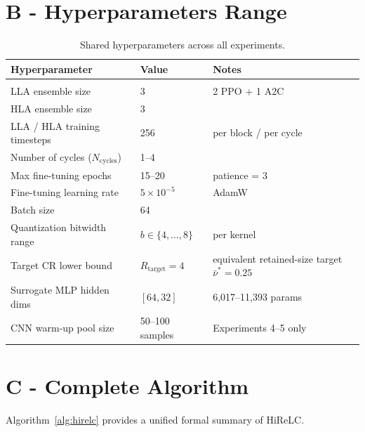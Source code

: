 \documentclass[preprint,12pt,authoryear]{elsarticle}
\begin{document}
\section*{B - Hyperparameters Range}
\label{sec:experiments_hyperparams}

\begin{table}[H]
    \caption{Shared hyperparameters across all experiments.}
    \label{tab:hyperparams}
    \begin{center}
        \begin{tabular}{lll}
            \textbf{Hyperparameter} & \textbf{Value} & \textbf{Notes} \\
            \hline \\
            LLA ensemble size        & 3              & 2 PPO + 1 A2C \\
            HLA ensemble size        & 3              & \\
            LLA / HLA training timesteps & 256        & per block / per cycle \\
            Number of cycles ($N_{\text{cycles}}$) & 1--4 & \\
            Max fine-tuning epochs   & 15--20 & patience = 3 \\
            Fine-tuning learning rate & $5 \times 10^{-5}$ & AdamW \\
            Batch size               & 64             & \\
            Quantization bitwidth range & $b \in \{4,\ldots,8\}$ & per kernel \\
            Target CR lower bound & $R_{\mathrm{target}} = 4$ & equivalent retained-size target $\bar{\nu}^*=0.25$ \\
            Surrogate MLP hidden dims & $[64, 32]$    & 6{,}017--11{,}393 params \\
            CNN warm-up pool size    & 50--100 samples    & Experiments 4--5 only \\
        \end{tabular}
    \end{center}
\end{table}


\section*{C - Complete Algorithm}
\label{sec:complete_algorithmic_implementation}

Algorithm~\ref{alg:hirelc} provides a unified formal summary of HiReLC.
\end{document}
